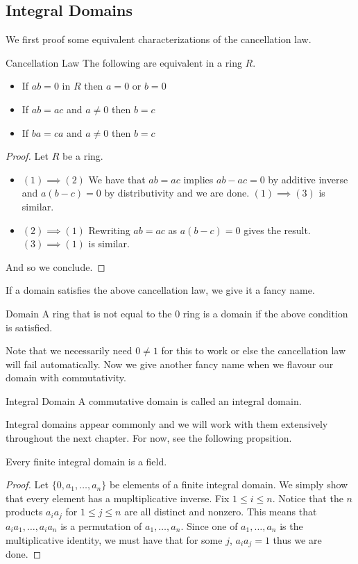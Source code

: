 \documentclass[a4paper]{article}
\begin{document}
\subsection{Integral Domains}
We first proof some equivalent characterizations of the cancellation law. 
\begin{prp}{Cancellation Law}{} The following are equivalent in a ring $R$. 
\begin{itemize}
\item If $ab=0$ in $R$ then $a=0$ or $b=0$
\item If $ab=ac$ and $a\neq 0$ then $b=c$
\item If $ba=ca$ and $a\neq 0$ then $b=c$
\end{itemize}\tcbline
\begin{proof}
Let $R$ be a ring. 
\begin{itemize}
\item $(1)\implies(2)$ We have that $ab=ac$ implies $ab-ac=0$ by additive inverse and $a(b-c)=0$ by distributivity and we are done. $(1)\implies(3)$ is similar. 
\item $(2)\implies(1)$ Rewriting $ab=ac$ as $a(b-c)=0$ gives the result. $(3)\implies(1)$ is similar. 
\end{itemize}
And so we conclude. 
\end{proof}
\end{prp}

If a domain satisfies the above cancellation law, we give it a fancy name. 

\begin{defn}{Domain}{} A ring that is not equal to the $0$ ring is a domain if the above condition is satisfied. 
\end{defn}

Note that we necessarily need $0\neq 1$ for this to work or else the cancellation law will fail automatically. Now we give another fancy name when we flavour our domain with commutativity. 

\begin{defn}{Integral Domain}{} A commutative domain is called an integral domain. 
\end{defn}

Integral domains appear commonly and we will work with them extensively throughout the next chapter. For now, see the following propsition. 

\begin{prp}{}{} Every finite integral domain is a field. \tcbline
\begin{proof}
Let $\{0,a_1,\dots,a_n\}$ be elements of a finite integral domain. We simply show that every element has a mupltiplicative inverse. Fix $1\leq i\leq n$. Notice that the $n$ products $a_ia_j$ for $1\leq j\leq n$ are all distinct and nonzero. This means that $a_ia_1,\dots,a_ia_n$ is a permutation of $a_1,\dots,a_n$. Since one of $a_1,\dots,a_n$ is the multiplicative identity, we must have that for some $j$, $a_ia_j=1$ thus we are done. 
\end{proof}
\end{prp}
\end{document}
